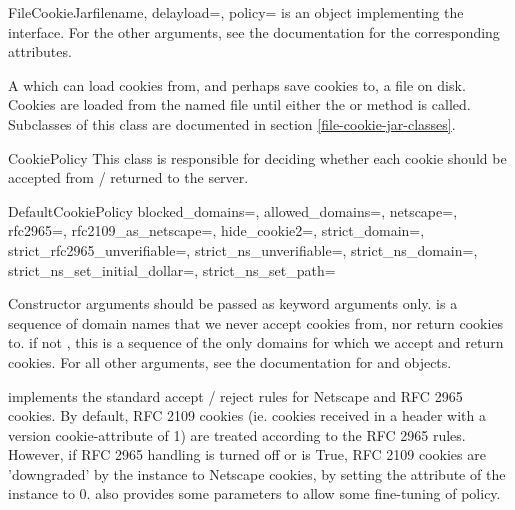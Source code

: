 \begin{classdesc}{FileCookieJar}{filename, delayload=,
 policy=}
 is an object implementing the 
interface.  For the other arguments, see the documentation for the
corresponding attributes.

A  which can load cookies from, and perhaps save
cookies to, a file on disk.  Cookies are  loaded from the
named file until either the  or 
method is called.  Subclasses of this class are documented in section
\ref{file-cookie-jar-classes}.
\end{classdesc}

\begin{classdesc}{CookiePolicy}{}
This class is responsible for deciding whether each cookie should be
accepted from / returned to the server.
\end{classdesc}

\begin{classdesc}{DefaultCookiePolicy}{
    blocked_domains=,
    allowed_domains=,
    netscape=, rfc2965=,
    rfc2109_as_netscape=,
    hide_cookie2=,
    strict_domain=,
    strict_rfc2965_unverifiable=,
    strict_ns_unverifiable=,
    strict_ns_domain=,
    strict_ns_set_initial_dollar=,
    strict_ns_set_path=
  }

Constructor arguments should be passed as keyword arguments only.
 is a sequence of domain names that we never
accept cookies from, nor return cookies to.  if
not , this is a sequence of the only domains for which
we accept and return cookies.  For all other arguments, see the
documentation for  and 
objects.

 implements the standard accept / reject
rules for Netscape and RFC 2965 cookies.  By default, RFC 2109 cookies
(ie. cookies received in a  header with a
version cookie-attribute of 1) are treated according to the RFC 2965
rules.  However, if RFC 2965 handling is turned off or
 is True, RFC 2109 cookies are
'downgraded' by the  instance to Netscape cookies, by
setting the  attribute of the  instance
to 0.   also provides some parameters to
allow some fine-tuning of policy.
\end{classdesc}


